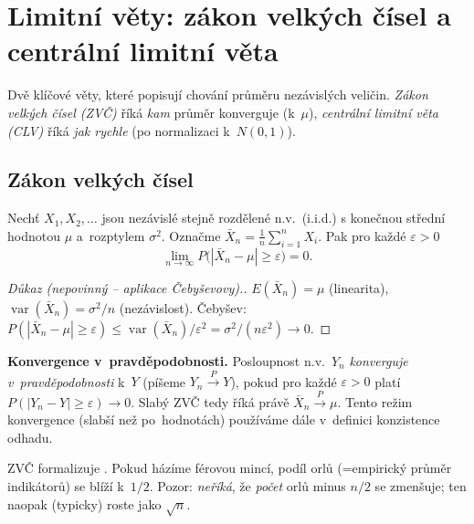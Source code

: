 \documentclass[11pt,a4paper]{article}
\DeclareMathOperator{\Var}{var}
\begin{document}
\section{Limitní věty: zákon velkých čísel a centrální limitní věta}

Dvě klíčové věty, které popisují chování průměru  nezávislých veličin. \emph{Zákon velkých čísel (ZVČ)} říká \emph{kam} průměr konverguje (k~$\mu$), \emph{centrální limitní věta (CLV)} říká \emph{jak rychle} (po normalizaci k~$N(0,1)$).

\subsection{Zákon velkých čísel}

\begin{veta}
Nechť $X_1,X_2,\dots$ jsou nezávislé stejně rozdělené n.v.\ (i.i.d.) s konečnou střední hodnotou $\mu$ a~rozptylem $\sigma^2$. Označme $\bar X_n=\tfrac{1}{n}\sum_{i=1}^n X_i$. Pak pro každé $\varepsilon>0$
\[
\lim_{n\to\infty} P\bigl(|\bar X_n-\mu|\ge\varepsilon\bigr)=0.
\]
\end{veta}

\begin{proof}[Důkaz \textnormal{(nepovinný -- aplikace Čebyševovy).}]
$E(\bar X_n)=\mu$ (linearita), $\Var(\bar X_n)=\sigma^2/n$ (nezávislost). Čebyšev: $P(|\bar X_n-\mu|\ge\varepsilon)\le\Var(\bar X_n)/\varepsilon^2=\sigma^2/(n\varepsilon^2)\to 0$.
\end{proof}

\begin{poznamka}
\textbf{Konvergence v~pravděpodobnosti.} Posloupnost n.v.\ $Y_n$ \emph{konverguje v~pravděpodobnosti} k~$Y$ (píšeme $Y_n\xrightarrow{P}Y$), pokud pro každé $\varepsilon>0$ platí $P(|Y_n-Y|\ge\varepsilon)\to 0$. Slabý ZVČ tedy říká právě $\bar X_n\xrightarrow{P}\mu$. Tento režim konvergence (slabší než po~hodnotách) používáme dále v~definici konzistence odhadu.
\end{poznamka}

\begin{intuice}
ZVČ formalizuje . Pokud házíme férovou mincí, podíl orlů (=empirický průměr indikátorů) se blíží k~$1/2$. Pozor: \emph{neříká}, že \emph{počet} orlů minus $n/2$ se zmenšuje; ten naopak (typicky) roste jako $\sqrt n$.
\end{intuice}
\end{document}
